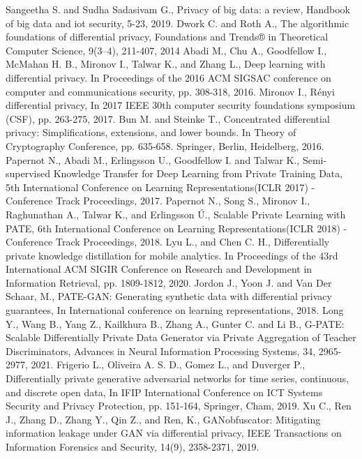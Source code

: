 \documentclass[conference]{IEEEtran}
\begin{document}
\begin{thebibliography}{00}
 Sangeetha S. and Sudha Sadasivam G., Privacy of big data: a review, Handbook of big data and iot security, 5-23, 2019.
 Dwork C. and Roth A., The algorithmic foundations of differential privacy, Foundations and Trends® in Theoretical Computer Science, 9(3–4), 211-407, 2014
 Abadi M., Chu A., Goodfellow I., McMahan H. B., Mironov I., Talwar K., and Zhang L., Deep learning with differential privacy. In Proceedings of the 2016 ACM SIGSAC conference on computer and communications security, pp. 308-318, 2016.
 Mironov I., Rényi differential privacy, In 2017 IEEE 30th computer security foundations symposium (CSF), pp. 263-275, 2017.
 Bun M. and Steinke T., Concentrated differential privacy: Simplifications, extensions, and lower bounds. In Theory of Cryptography Conference, pp. 635-658. Springer, Berlin, Heidelberg, 2016.
 Papernot N., Abadi M., Erlingsson U., Goodfellow I. and Talwar K., Semi-supervised Knowledge Transfer for Deep Learning from Private Training Data, 5th International Conference on Learning Representations(ICLR 2017) - Conference Track Proceedings, 2017.
 Papernot N., Song S., Mironov I., Raghunathan A., Talwar K., and Erlingsson Ú., Scalable Private Learning with PATE, 6th International Conference on Learning Representations(ICLR 2018) - Conference Track Proceedings, 2018.
 Lyu L., and Chen C. H., Differentially private knowledge distillation for mobile analytics. In Proceedings of the 43rd International ACM SIGIR Conference on Research and Development in Information Retrieval, pp. 1809-1812, 2020. 
 Jordon J., Yoon J. and Van Der Schaar, M., PATE-GAN: Generating synthetic data with differential privacy guarantees, In International conference on learning representations, 2018.
 Long Y., Wang B., Yang Z., Kailkhura B., Zhang A., Gunter C. and Li B., G-PATE: Scalable Differentially Private Data Generator via Private Aggregation of Teacher Discriminators, Advances in Neural Information Processing Systems, 34, 2965-2977, 2021.
 Frigerio L., Oliveira A. S. D., Gomez L., and Duverger P., Differentially private generative adversarial networks for time series, continuous, and discrete open data, In IFIP International Conference on ICT Systems Security and Privacy Protection, pp. 151-164, Springer, Cham, 2019.
 Xu C., Ren J., Zhang D., Zhang Y., Qin Z., and Ren, K., GANobfuscator: Mitigating information leakage under GAN via differential privacy, IEEE Transactions on Information Forensics and Security, 14(9), 2358-2371, 2019.

\end{thebibliography}
\end{document}
